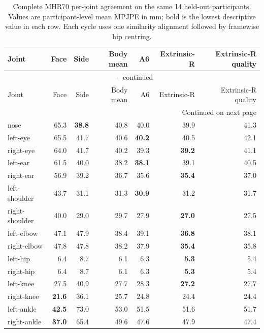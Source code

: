 \begin{longtable}{lrrrrrr}
\caption{Complete MHR70 per-joint agreement on the same 14 held-out
participants. Values are participant-level mean MPJPE in mm; bold is the
lowest descriptive value in each row. Each cycle uses one similarity alignment
followed by framewise hip centring.}\label{tab:joint-accuracy-all70}\\
\toprule
Joint & Face & Side & Body mean & A6 & Extrinsic-R & Extrinsic-R quality \\
\midrule
\endfirsthead
\multicolumn{7}{c}{\tablename\ \thetable{} -- continued}\\
\toprule
Joint & Face & Side & Body mean & A6 & Extrinsic-R & Extrinsic-R quality \\
\midrule
\endhead
\midrule
\multicolumn{7}{r}{Continued on next page}\\
\endfoot
\bottomrule
\endlastfoot
nose & 65.3 & \textbf{38.8} & 40.8 & 40.0 & 39.9 & 41.3 \\ %
left-eye & 65.5 & 41.7 & 40.6 & \textbf{40.2} & 40.5 & 42.1 \\ %
right-eye & 64.0 & 41.7 & 40.2 & 39.3 & \textbf{39.2} & 41.1 \\ %
left-ear & 61.5 & 40.0 & 38.2 & \textbf{38.1} & 39.1 & 40.5 \\ %
right-ear & 56.9 & 39.2 & 36.7 & 35.6 & \textbf{35.4} & 37.0 \\ %
left-shoulder & 43.7 & 31.1 & 31.3 & \textbf{30.9} & 31.2 & 31.7 \\ %
right-shoulder & 40.0 & 29.0 & 29.7 & 27.9 & \textbf{27.0} & 27.5 \\ %
left-elbow & 47.1 & 47.9 & 38.4 & 39.1 & \textbf{36.8} & 38.1 \\ %
right-elbow & 47.8 & 47.8 & 38.2 & 37.9 & \textbf{35.4} & 35.8 \\ %
left-hip & 6.4 & 8.7 & 6.1 & 6.3 & \textbf{5.3} & 5.4 \\ %
right-hip & 6.4 & 8.7 & 6.1 & 6.3 & \textbf{5.3} & 5.4 \\ %
left-knee & 27.5 & 40.9 & 27.7 & 28.3 & \textbf{27.2} & 27.7 \\ %
right-knee & \textbf{21.6} & 36.1 & 25.7 & 24.8 & 24.4 & 24.4 \\ %
left-ankle & \textbf{42.5} & 73.0 & 53.0 & 51.5 & 51.6 & 51.7 \\ %
right-ankle & \textbf{37.0} & 65.4 & 49.6 & 47.6 & 47.9 & 47.4 \\ %

\end{longtable}
